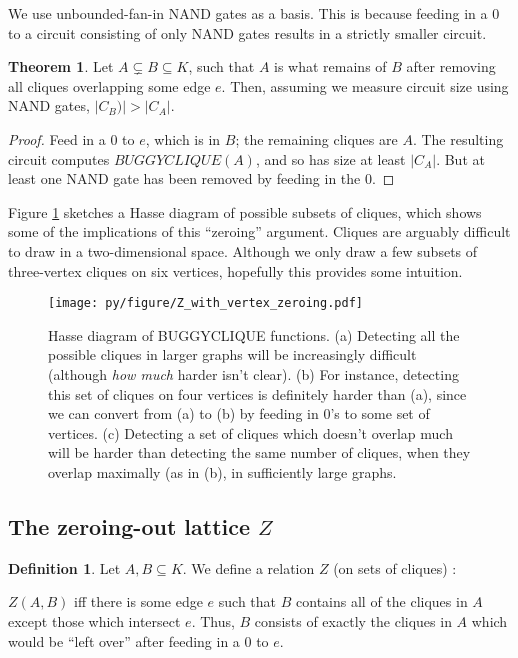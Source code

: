 \documentclass[12pt]{article}
\theoremstyle{definition}
\newtheorem{thm}{Theorem}[section]
\newtheorem{defn}{Definition}[section]
\begin{document}
We use unbounded-fan-in NAND gates as a basis.
This is because feeding in a 0 to a circuit consisting of only NAND
gates results in a strictly smaller circuit.

\begin{thm}
\label{edgeZonking}
Let $A \subsetneq B \subseteq K$, such that $A$ is what remains
of $B$ after removing all cliques overlapping some edge $e$.
Then, assuming we measure circuit size using NAND gates,
 $|C_B)| > |C_A|$.
\end{thm}
\begin{proof}
Feed in a 0 to $e$, which is in $B$; the remaining cliques are $A$.
The resulting
circuit computes $BUGGYCLIQUE(A)$, and so has size
at least $|C_A|$. But at least one
NAND gate has been removed by feeding in the 0.
\end{proof}

Figure \ref{fig:Hasse}
sketches a Hasse diagram of possible subsets of cliques,
which shows some of the implications of this ``zeroing'' argument.
Cliques are arguably difficult to draw in a two-dimensional space.
Although we only draw a few subsets of three-vertex cliques
on six vertices, hopefully this provides some
intuition.

\begin{figure}
\label{fig:Hasse}
\centering
\texttt{[image: py/figure/Z\_with\_vertex\_zeroing.pdf]}
\caption{Hasse diagram of BUGGYCLIQUE functions.
(a)
Detecting all the possible cliques in larger graphs will be
increasingly difficult (although {\em how much} harder isn't clear).
(b) For instance,
detecting this set of cliques on four vertices
is definitely harder than (a),
since we can convert from (a) to (b) by feeding in 0's to
some set of vertices.
(c) Detecting a set of cliques which doesn't overlap much will be
harder than detecting the same number of cliques, when they overlap
maximally (as in (b), in sufficiently large graphs.
}
\end{figure}

\subsection{The zeroing-out lattice $Z$}

\begin{defn}
\label{zRelation}
Let $A, B \subseteq K$. We define a relation $Z$ (on sets of cliques) :

$Z(A,B)$ iff there is some edge $e$ such that $B$ contains all of the
cliques in $A$ except those which intersect $e$. Thus, $B$ consists
of exactly the cliques in $A$ which would be ``left over'' after
feeding in a 0 to $e$.
\end{defn}
\end{document}
